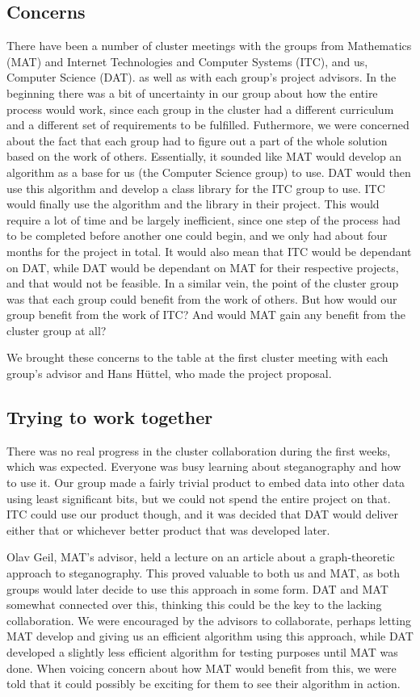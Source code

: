 \subsection{Concerns}
There have been a number of cluster meetings with the groups from Mathematics (MAT) and Internet Technologies and Computer Systems (ITC), and us, Computer Science (DAT). as well as with each group's project advisors.
In the beginning there was a bit of uncertainty in our group about how the entire process would work, since each group in the cluster had a different curriculum and a different set of requirements to be fulfilled.
Futhermore, we were concerned about the fact that each group had to figure out a part of the whole solution based on the work of others.
Essentially, it sounded like MAT would develop an algorithm as a base for us (the Computer Science group) to use.
DAT would then use this algorithm and develop a class library for the ITC group to use.
ITC would finally use the algorithm and the library in their project.
This would require a lot of time and be largely inefficient, since one step of the process had to be completed before another one could begin, and we only had about four months for the project in total.
It would also mean that ITC would be dependant on DAT, while DAT would be dependant on MAT for their respective projects, and that would not be feasible.
In a similar vein, the point of the cluster group was that each group could benefit from the work of others.
But how would our group benefit from the work of ITC? And would MAT gain any benefit from the cluster group at all?

We brought these concerns to the table at the first cluster meeting with each group's advisor and Hans Hüttel, who made the project proposal.

\subsection{Trying to work together}
There was no real progress in the cluster collaboration during the first weeks, which was expected.
Everyone was busy learning about steganography and how to use it.
Our group made a fairly trivial product to embed data into other data using least significant bits, but we could not spend the entire project on that.
ITC could use our product though, and it was decided that DAT would deliver either that or whichever better product that was developed later.

Olav Geil, MAT's advisor, held a lecture on an article about a graph-theoretic approach to steganography.
This proved valuable to both us and MAT, as both groups would later decide to use this approach in some form.
DAT and MAT somewhat connected over this, thinking this could be the key to the lacking collaboration.
We were encouraged by the advisors to collaborate, perhaps letting MAT develop and giving us an efficient algorithm using this approach, while DAT developed a slightly less efficient algorithm for testing purposes until MAT was done.
When voicing concern about how MAT would benefit from this, we were told that it could possibly be exciting for them to see their algorithm in action.

